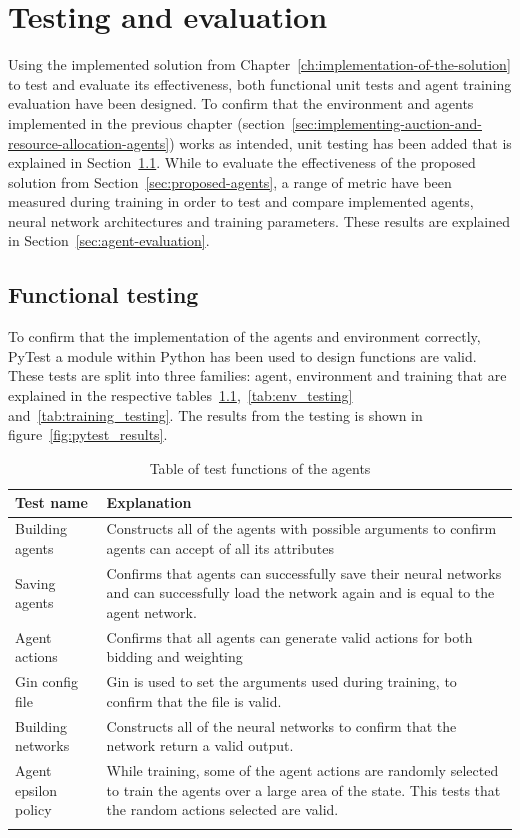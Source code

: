 
\chapter{Testing and evaluation}\label{ch:testing-and-evaluation}
Using the implemented solution from Chapter~\ref{ch:implementation-of-the-solution} to test and evaluate its
effectiveness, both functional unit tests and agent training evaluation have been designed. To confirm that the
environment and agents implemented in the previous chapter
(section~\ref{sec:implementing-auction-and-resource-allocation-agents}) works as intended, unit testing has been added
that is explained in Section~\ref{sec:functional-testing}. While to evaluate the effectiveness of the proposed
solution from Section~\ref{sec:proposed-agents}, a range of metric have been measured during training in order to
test and compare implemented agents, neural network architectures and training parameters. These results are explained
in Section~\ref{sec:agent-evaluation}.

\section{Functional testing}\label{sec:functional-testing}
To confirm that the implementation of the agents and environment correctly, PyTest a module within Python has been used
to design functions are valid. These tests are split into three families: agent, environment and training that are
explained in the respective tables~\ref{tab:agent_testing},~\ref{tab:env_testing} and~\ref{tab:training_testing}.
The results from the testing is shown in figure~\ref{fig:pytest_results}.

\begin{longtable}{|p{3cm}|p{11cm}|} \hline
    \textbf{Test name} & \textbf{Explanation} \\ \hline
    Building agents & Constructs all of the agents with possible arguments to confirm agents can accept of all its
        attributes\\ \hline
    Saving agents & Confirms that agents can successfully save their neural networks and can successfully load
        the network again and is equal to the agent network. \\ \hline
    Agent actions & Confirms that all agents can generate valid actions for both bidding and weighting \\ \hline
    Gin config file & Gin is used to set the arguments used during training, to confirm that the file is valid. \\ \hline
    Building networks & Constructs all of the neural networks to confirm that the network return a valid output. \\ \hline
    Agent epsilon policy & While training, some of the agent actions are randomly selected to train the agents over
        a large area of the state. This tests that the random actions selected are valid. \\ \hline
    \caption{Table of test functions of the agents}
    \label{tab:agent_testing}
\end{longtable}

